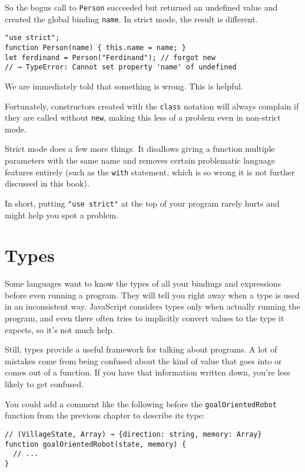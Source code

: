So the bogus call to \lstinline`Person` succeeded but returned an undefined value and created the global binding \lstinline`name`. In strict mode, the result is different.

\begin{lstlisting}
"use strict";
function Person(name) { this.name = name; }
let ferdinand = Person("Ferdinand"); // forgot new
// → TypeError: Cannot set property 'name' of undefined
\end{lstlisting}
\noindent

We are immediately told that something is wrong. This is helpful.

Fortunately, constructors created with the \lstinline`class` notation will always complain if they are called without \lstinline`new`, making this less of a problem even in non-strict mode.

Strict mode does a few more things. It disallows giving a function multiple parameters with the same name and removes certain problematic language features entirely (such as the \lstinline`with` statement, which is so wrong it is not further discussed in this book).

In short, putting \lstinline`"use strict"` at the top of your program rarely hurts and might help you spot a problem.

\section{Types}

Some languages want to know the types of all your bindings and expressions before even running a program. They will tell you right away when a type is used in an inconsistent way. JavaScript considers types only when actually running the program, and even there often tries to implicitly convert values to the type it expects, so it's not much help.

Still, types provide a useful framework for talking about programs. A lot of mistakes come from being confused about the kind of value that goes into or comes out of a function. If you have that information written down, you're less likely to get confused.

You could add a comment like the following before the \lstinline`goalOrientedRobot` function from the previous chapter to describe its type:

\begin{lstlisting}
// (VillageState, Array) → {direction: string, memory: Array}
function goalOrientedRobot(state, memory) {
  // ...
}
\end{lstlisting}
\noindent

